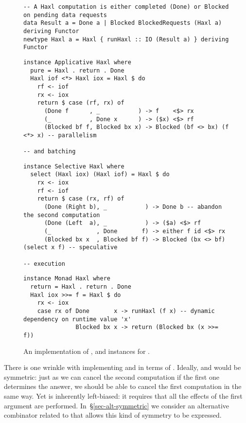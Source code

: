 \begin{figure}
\begin{verbatim}
-- A Haxl computation is either completed (Done) or Blocked on pending data requests
data Result a = Done a | Blocked BlockedRequests (Haxl a) deriving Functor
newtype Haxl a = Haxl { runHaxl :: IO (Result a) } deriving Functor
\end{verbatim}
\vspace{1mm}
\begin{verbatim}
instance Applicative Haxl where
  pure = Haxl . return . Done
  Haxl iof <*> Haxl iox = Haxl $ do
    rf <- iof
    rx <- iox
    return $ case (rf, rx) of
      (Done f      , _           ) -> f    <$> rx
      (_           , Done x      ) -> ($x) <$> rf
      (Blocked bf f, Blocked bx x) -> Blocked (bf <> bx) (f <*> x) -- parallelism
                                                                   -- and batching
\end{verbatim}
\vspace{-3mm}
\begin{verbatim}
instance Selective Haxl where
  select (Haxl iox) (Haxl iof) = Haxl $ do
    rx <- iox
    rf <- iof
    return $ case (rx, rf) of
      (Done (Right b), _           ) -> Done b -- abandon the second computation
      (Done (Left  a), _           ) -> ($a) <$> rf
      (_             , Done       f) -> either f id <$> rx
      (Blocked bx x  , Blocked bf f) -> Blocked (bx <> bf) (select x f) -- speculative
                                                                        -- execution
\end{verbatim}
\vspace{-3mm}
\begin{verbatim}
instance Monad Haxl where
  return = Haxl . return . Done
  Haxl iox >>= f = Haxl $ do
    rx <- iox
    case rx of Done       x -> runHaxl (f x) -- dynamic dependency on runtime value 'x'
               Blocked bx x -> return (Blocked bx (x >>= f))
\end{verbatim}
\vspace{-2mm}
\caption{An implementation of ,  and  instances for \Haxl.}
\label{fig-haxl}
\vspace{-4mm}
\end{figure}

There is one wrinkle with implementing  and 
in terms of . Ideally,  and  would be
symmetric: just as we can cancel the second computation if the first
one determines the answer, we should be able to cancel the first
computation in the same way. Yet  is inherently left-biased:
it requires that all the effects of the first argument are performed.
In~\S\ref{sec-alt-symmetric} we consider an alternative combinator
related to  that allows this kind of symmetry to be expressed.

